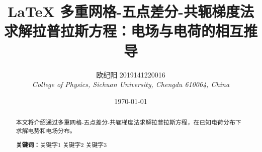 \documentclass{article} %
\title{\LaTeX{} 多重网格-五点差分-共轭梯度法求解拉普拉斯方程：电场与电荷的相互推导} %
\author{欧纪阳 2019141220016\\ \textit{College of Physics, Sichuan University, Chengdu 610064, China}} %
\date{\today} %
\begin{document}
\maketitle %
\begin{abstract} %
    \qquad 本文将介绍通过多重网格-五点差分-共轭梯度法求解拉普拉斯方程，在已知电荷分布下求解电势和电场分布。

    \textbf{关键词：}关键字1 \quad 关键字2 \quad 关键字3
\end{abstract}

\tableofcontents %
\thispagestyle{empty} %

\newpage
\section{}
\end{document}
